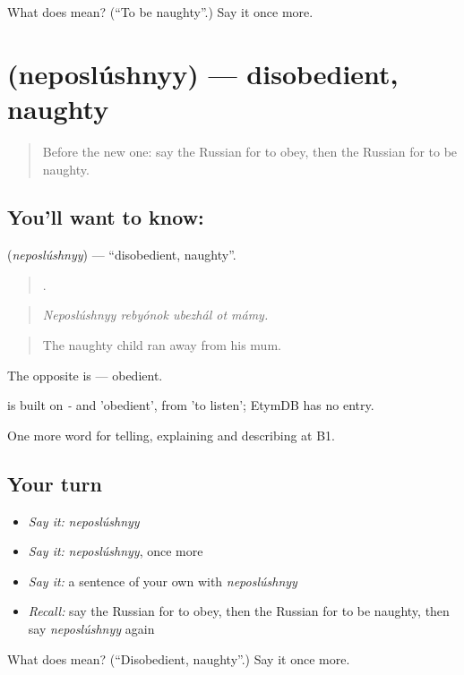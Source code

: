 \begin{tcolorbox}[breakable,colback=teal!4,colframe=teal!35!black,title={Before you move on}]
What does  mean? (\textquotedblleft{}To be naughty\textquotedblright{}.) Say it once more.
\end{tcolorbox}
\section[\texorpdfstring{\ru{непослушный} (neposlúshnyy)}{непослушный (neposlúshnyy)}]{ (neposlúshnyy) — disobedient, naughty}

\label{lesson:RU-C497-neposlushnyy}



\begin{quote}
Before the new one: say the Russian for to obey, then the Russian for to be naughty.
\end{quote}

\subsection*{You'll want to know: }
\textbf{} (\emph{neposlúshnyy}) — \textquotedblleft{}disobedient, naughty\textquotedblright{}.

\begin{quote}
    .
\end{quote}

\begin{quote}
\emph{Neposlúshnyy rebyónok ubezhál ot mámy.}
\end{quote}

\begin{quote}
The naughty child ran away from his mum.
\end{quote}

The opposite is \emph{} — obedient.

\begin{cousinweb}
\emph{} is built on \emph{-} and \emph{} 'obedient', from \emph{} 'to listen'; EtymDB has no entry.
\end{cousinweb}

\begin{grammarlens}[title={What you've built}]
One more word for telling, explaining and describing at B1.
\end{grammarlens}

\subsection*{Your turn}
\begin{itemize}
\raggedright
  \item \emph{Say it:} \emph{neposlúshnyy}
  \item \emph{Say it:} \emph{neposlúshnyy}, once more
  \item \emph{Say it:} a sentence of your own with \emph{neposlúshnyy}
  \item \emph{Recall:} say the Russian for to obey, then the Russian for to be naughty, then say \emph{neposlúshnyy} again
\end{itemize}

\begin{tcolorbox}[breakable,colback=teal!4,colframe=teal!35!black,title={Before you move on}]
What does  mean? (\textquotedblleft{}Disobedient, naughty\textquotedblright{}.) Say it once more.
\end{tcolorbox}
